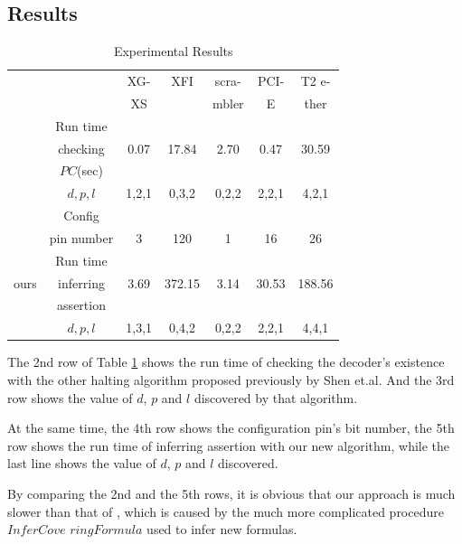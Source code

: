 \documentclass{sig-alternate}
\begin{document}
\subsection{Results}
\begin{table}[t]
\centering
\caption{Experimental Results}
\begin{tabular}{|c|c|c|c|c|c|c|}
\hline
&                                        &XG-     &XFI       &scra-     &PCI-    &T2 e-\\
&                                        &XS      &          &mbler     &E         &ther\\\hline
&Run time                           &&&&&\\
&checking                    &0.07     &17.84     &2.70      &0.47    &30.59       \\
\cite{ShengYuShen:fmcad10}&$PC$(sec)     &&&&&\\\cline{2-7}
&$d,p,l$                                 &1,2,1    &0,3,2     &0,2,2     &2,2,1   &4,2,1         \\ \hline\hline
&Config                 &&&&&\\
&pin number                              &3        &120       &1         &16      &26\\\cline{2-7}
&Run time                         &&&&&\\
ours&inferring                   &3.69     &372.15    &3.14      &30.53   &188.56      \\
&assertion                      &&&&&\\\cline{2-7}
&$d,p,l$                                 &1,3,1    &0,4,2     &0,2,2     &2,2,1   &4,4,1          \\ \hline
\end{tabular}\label{tab_res}
\end{table}

The 2nd row of Table \ref{tab_res} shows the run time of checking the decoder's existence
with the other halting algorithm proposed previously by Shen et.al\cite{ShengYuShen:fmcad10}.
And the 3rd row shows the value of $d$, $p$ and $l$ discovered by that algorithm.

At the same time,
the 4th row shows the configuration pin's bit number,
the 5th row shows the run time of inferring assertion with our new algorithm,
while the last line shows the value of $d$, $p$ and $l$ discovered.

By comparing the 2nd and the 5th rows,
it is obvious that our approach is much slower than that of \cite{ShengYuShen:fmcad10},
which is caused by the much more complicated procedure $InferCove$ $ringFormula$
used to infer new formulas.
\end{document}

